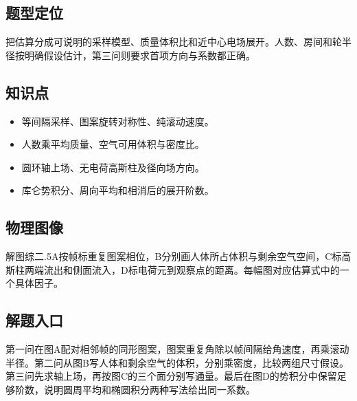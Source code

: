 \documentclass[UTF8,fontset=fandol,a4paper,11pt]{ctexart}
\begin{document}


\subsection*{题型定位}

把估算分成可说明的采样模型、质量体积比和近中心电场展开。人数、房间和轮半径按明确假设估计，第三问则要求首项方向与系数都正确。



\subsection*{知识点}

\begin{itemize}
\item 等间隔采样、图案旋转对称性、纯滚动速度。
\item 人数乘平均质量、空气可用体积与密度比。
\item 圆环轴上场、无电荷高斯柱及径向场方向。
\item 库仑势积分、周向平均和相消后的展开阶数。
\end{itemize}



\subsection*{物理图像}

解图综二.5A按帧标重复图案相位，B分别画人体所占体积与剩余空气空间，C标高斯柱两端流出和侧面流入，D标电荷元到观察点的距离。每幅图对应估算式中的一个具体因子。



\subsection*{解题入口}

第一问在图A配对相邻帧的同形图案，图案重复角除以帧间隔给角速度，再乘滚动半径。第二问从图B写人体和剩余空气的体积，分别乘密度，比较两组尺寸假设。第三问先求轴上场，再按图C的三个面分别写通量。最后在图D的势积分中保留足够阶数，说明圆周平均和椭圆积分两种写法给出同一系数。
\end{document}
